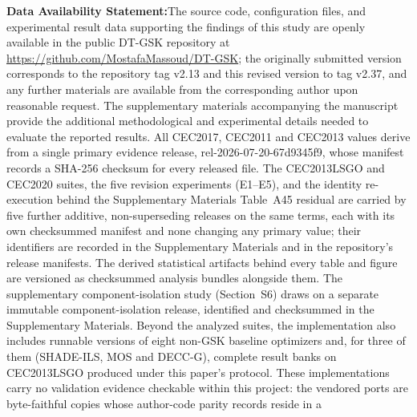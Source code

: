 \documentclass[algorithms,article,submit,moreauthors,pdftex]{Definitions/mdpi}
\newcommand{\dtgsk}{DT-GSK}
\begin{document}
\vspace{1em}
\noindent\textbf{Data Availability Statement:}\quad The source code,
configuration files, and experimental result data supporting the findings of
this study are openly available in the public \dtgsk{} repository at
\url{https://github.com/MostafaMassoud/DT-GSK}; the originally submitted
version corresponds to the repository tag v2.13 and this revised version to
tag v2.37, and any further materials are
available from the corresponding author upon reasonable request. The
supplementary materials accompanying the manuscript provide the additional
methodological and experimental details needed to evaluate the reported
results.
All CEC2017, CEC2011 and CEC2013 values derive from a single primary
evidence release, rel-2026-07-20-67d9345f9, whose manifest records a
SHA-256 checksum for every released file. The CEC2013LSGO and CEC2020
suites, the five revision experiments (E1--E5), and the identity
re-execution behind the Supplementary Materials Table~A45 residual are
carried by five further additive, non-superseding releases on the same
terms, each with its own checksummed manifest and none changing any
primary value; their identifiers are recorded in the Supplementary
Materials and in the repository's release manifests. The derived
statistical artifacts behind every table and figure are versioned as
checksummed analysis bundles alongside them. The supplementary component-isolation study
(Section~S6) draws on a separate immutable component-isolation release,
identified and checksummed in the Supplementary Materials. %
Beyond the analyzed suites, the implementation also includes runnable
versions of eight non-GSK baseline optimizers and, for three of
them (SHADE-ILS, MOS and DECC-G), complete result banks on CEC2013LSGO
produced under this paper's protocol. These implementations carry no
validation evidence checkable within this project: the vendored ports
are byte-faithful copies whose author-code parity records reside in a
\end{document}
